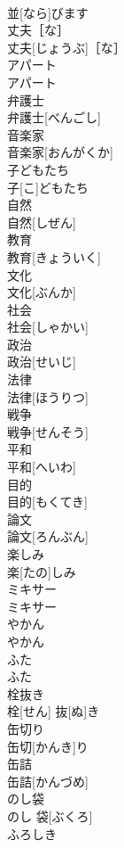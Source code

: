 \documentclass[8pt]{extreport}
\begin{document}
\begin{CJK}{UTF8}{min}
\\	並[なら]びます	
\\	丈夫［な］	
\\	丈夫[じょうぶ]［な］	
\\	アパート	
\\	アパート	
\\	弁護士	
\\	弁護士[べんごし]	
\\	音楽家	
\\	音楽家[おんがくか]	
\\	子どもたち	
\\	子[こ]どもたち	
\\	自然	
\\	自然[しぜん]	
\\	教育	
\\	教育[きょういく]	
\\	文化	
\\	文化[ぶんか]	
\\	社会	
\\	社会[しゃかい]	
\\	政治	
\\	政治[せいじ]	
\\	法律	
\\	法律[ほうりつ]	
\\	戦争	
\\	戦争[せんそう]	
\\	平和	
\\	平和[へいわ]	
\\	目的	
\\	目的[もくてき]	
\\	論文	
\\	論文[ろんぶん]	
\\	楽しみ	
\\	楽[たの]しみ	
\\	ミキサー	
\\	ミキサー	
\\	やかん	
\\	やかん	
\\	ふた	
\\	ふた	
\\	栓抜き	
\\	栓[せん] 抜[ぬ]き	
\\	缶切り	
\\	缶切[かんき]り	
\\	缶詰	
\\	缶詰[かんづめ]	
\\	のし袋	
\\	のし 袋[ぶくろ]	
\\	ふろしき	

\end{CJK}
\end{document}
